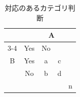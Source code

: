 \begin{table}[ht]
	\centering
	\caption{対応のあるカテゴリ判断}
	\begin{tabular}{c|c|cc|c}
		\multicolumn{2}{c|}{} & \multicolumn{2}{c|}{A}              \\
		\cline{3-4}
		\multicolumn{2}{c|}{}
		                      & Yes                    & No &       \\ \hline
		B                     & Yes                    & a  & c &   \\
		                      & No                     & b  & d &   \\ \hline
		                      &                        &    &   & n \\
	\end{tabular}
	\label{tbl:23_03}
\end{table}
